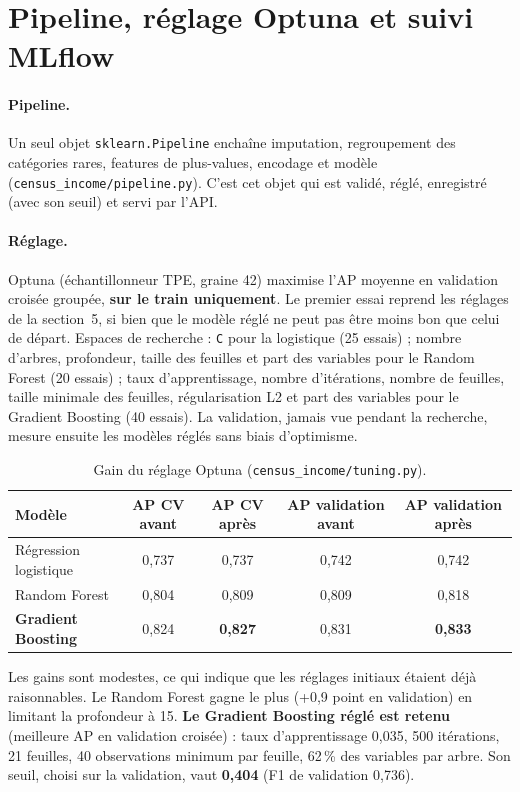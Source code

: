 \documentclass[11pt,a4paper]{article}
\begin{document}
\section{Pipeline, réglage Optuna et suivi MLflow}

\paragraph{Pipeline.} Un seul objet \texttt{sklearn.Pipeline} enchaîne imputation, regroupement des catégories rares, features de plus-values, encodage et modèle (\texttt{census\_income/pipeline.py}). C'est cet objet qui est validé, réglé, enregistré (avec son seuil) et servi par l'API.

\paragraph{Réglage.} Optuna (échantillonneur TPE, graine 42) maximise l'AP moyenne en validation croisée groupée, \textbf{sur le train uniquement}. Le premier essai reprend les réglages de la section~5, si bien que le modèle réglé ne peut pas être moins bon que celui de départ. Espaces de recherche : \texttt{C} pour la logistique (25 essais) ; nombre d'arbres, profondeur, taille des feuilles et part des variables pour le Random Forest (20 essais) ; taux d'apprentissage, nombre d'itérations, nombre de feuilles, taille minimale des feuilles, régularisation L2 et part des variables pour le Gradient Boosting (40 essais). La validation, jamais vue pendant la recherche, mesure ensuite les modèles réglés sans biais d'optimisme.

\begin{table}[H]
\centering\small
\begin{tabular}{lcccc}
\toprule
Modèle & AP CV avant & AP CV après & AP validation avant & AP validation après \\
\midrule
Régression logistique & 0,737 & 0,737 & 0,742 & 0,742 \\
Random Forest & 0,804 & 0,809 & 0,809 & 0,818 \\
\textbf{Gradient Boosting} & 0,824 & \textbf{0,827} & 0,831 & \textbf{0,833} \\
\bottomrule
\end{tabular}
\caption{Gain du réglage Optuna (\texttt{census\_income/tuning.py}).}
\end{table}

Les gains sont modestes, ce qui indique que les réglages initiaux étaient déjà raisonnables. Le Random Forest gagne le plus (+0,9 point en validation) en limitant la profondeur à 15. \textbf{Le Gradient Boosting réglé est retenu} (meilleure AP en validation croisée) : taux d'apprentissage 0,035, 500 itérations, 21 feuilles, 40 observations minimum par feuille, 62\,\% des variables par arbre. Son seuil, choisi sur la validation, vaut \textbf{0,404} (F1 de validation 0,736).
\end{document}
